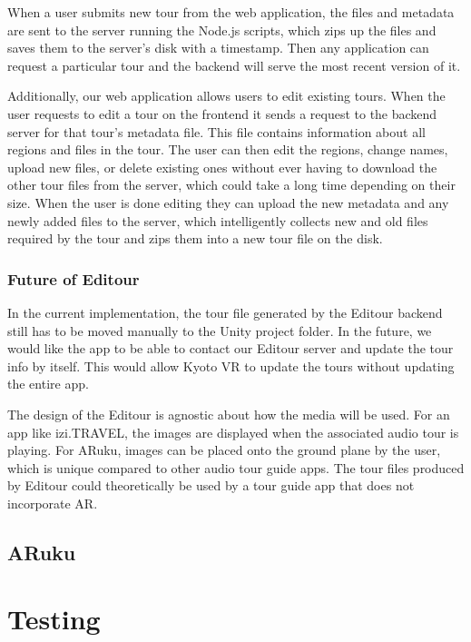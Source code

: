 \documentclass[a4paper, 10pt, american, titlepage]{article}
\begin{document}
When a user submits new tour from the web application, the files and metadata
are sent to the server running the Node.js scripts, which zips up the files and
saves them to the server's disk with a timestamp. Then any application can
request a particular tour and the backend will serve the most recent version of
it.

Additionally, our web application allows users to edit existing tours. When the
user requests to edit a tour on the frontend it sends a request to the backend
server for that tour's metadata file. This file contains information about all
regions and files in the tour. The user can then edit the regions, change names,
upload new files, or delete existing ones without ever having to download the
other tour files from the server, which could take a long time depending on
their size. When the user is done editing they can upload the new metadata and
any newly added files to the server, which intelligently collects new and old
files required by the tour and zips them into a new tour file on the disk.


\subsubsection{Future of Editour}
\label{sec:futureOfEditour}

In the current implementation, the tour file generated by the Editour backend
still has to be moved manually to the Unity project folder. In the future, we
would like the app to be able to contact our Editour server and update the tour
info by itself. This would allow Kyoto VR to update the tours without updating
the entire app.

The design of the Editour is agnostic about how the media will be used.  For
an app like izi.TRAVEL, the images are displayed when the associated audio
tour is playing. For ARuku, images can be placed onto the ground plane by the
user, which is unique compared to other audio tour guide apps. The tour files
produced by Editour could theoretically be used by a tour guide app that does
not incorporate AR. 

\subsection{ARuku}
\label{sec:aruku}

\section{Testing}
\label{sec:testing}
\end{document}
